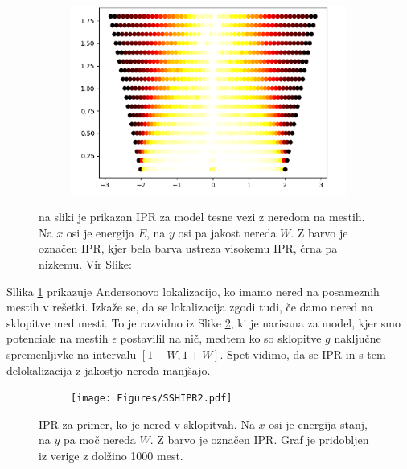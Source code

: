 \begin{figure}[H]
\centering
\begin{subfigure}{.7\textwidth}
\includegraphics[width=\linewidth]{Figures/AndersonIPR.pdf}
\end{subfigure}
\caption{na sliki je prikazan IPR za model tesne vezi z neredom na mestih. Na $x$ osi je energija $E$, na $y$ osi pa jakost nereda $W$. Z barvo je označen IPR, kjer bela barva ustreza visokemu IPR, črna pa nizkemu. Vir Slike: \cite{anderson}}
\label{fig:AndersonIPR}
\end{figure}
Sllika \ref{fig:AndersonIPR} prikazuje Andersonovo lokalizacijo, ko imamo nered na posameznih mestih v rešetki. Izkaže se, da se lokalizacija zgodi tudi, če damo nered na sklopitve med mesti. To je razvidno iz Slike \ref{fig:SSHIPR}, ki je narisana za model, kjer smo potenciale na mestih $\epsilon$ postavilil na nič, medtem ko so sklopitve $g$ naključne spremenljivke na intervalu $[1-W,1+W]$. Spet vidimo, da se IPR in s tem delokalizacija z jakostjo nereda manjšajo.
\begin{figure}[H]
\centering
\begin{subfigure}{\textwidth}
\texttt{[image: Figures/SSHIPR2.pdf]}
\end{subfigure}
\caption{IPR za primer, ko je nered v sklopitvah. Na $x$ osi je energija stanj, na $y$ pa moč nereda $W$. Z barvo je označen IPR. Graf je pridobljen iz verige z dolžino 1000 mest.}
\label{fig:SSHIPR}
\end{figure}

